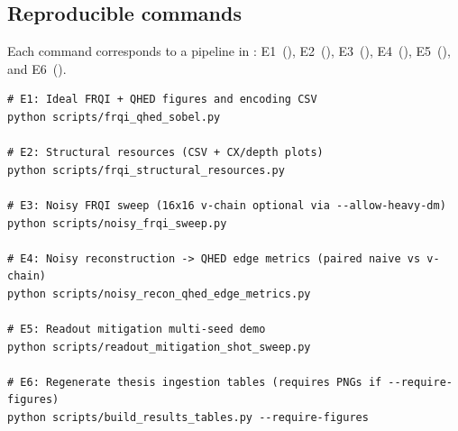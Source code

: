 \subsection{Reproducible commands}
Each command corresponds to a pipeline in : E1~(), E2~(), E3~(), E4~(), E5~(), and E6~().
\begin{lstlisting}[language={}, basicstyle=\ttfamily\footnotesize, frame=single, breaklines=true]
# E1: Ideal FRQI + QHED figures and encoding CSV
python scripts/frqi_qhed_sobel.py

# E2: Structural resources (CSV + CX/depth plots)
python scripts/frqi_structural_resources.py

# E3: Noisy FRQI sweep (16x16 v-chain optional via --allow-heavy-dm)
python scripts/noisy_frqi_sweep.py

# E4: Noisy reconstruction -> QHED edge metrics (paired naive vs v-chain)
python scripts/noisy_recon_qhed_edge_metrics.py

# E5: Readout mitigation multi-seed demo
python scripts/readout_mitigation_shot_sweep.py

# E6: Regenerate thesis ingestion tables (requires PNGs if --require-figures)
python scripts/build_results_tables.py --require-figures
\end{lstlisting}
